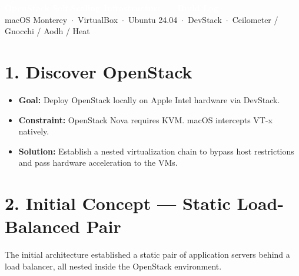 \documentclass[10pt,a4paper]{article}
\begin{document}
\begin{tcolorbox}[colback=osbg, colframe=osbg, arc=4pt, boxsep=2pt, left=6pt]
    \textcolor{white}{\Large\bfseries OpenStack Self-Scaling Infrastructure --- Build Log} \\
    \textcolor{osgray}{\small macOS Monterey \,$\cdot$\, VirtualBox \,$\cdot$\, Ubuntu 24.04 \,$\cdot$\, DevStack \,$\cdot$\, Ceilometer / Gnocchi / Aodh / Heat}
\end{tcolorbox}

\vspace{0.3em}

\section*{1. Discover OpenStack}
\begin{itemize}
    \item \textbf{Goal:} Deploy OpenStack locally on Apple Intel hardware via DevStack.
    \item \textbf{Constraint:} OpenStack Nova requires KVM. macOS intercepts VT-x natively.
    \item \textbf{Solution:} Establish a nested virtualization chain to bypass host restrictions and pass hardware acceleration to the VMs.
\end{itemize}

\section*{2. Initial Concept --- Static Load-Balanced Pair}
The initial architecture established a static pair of application servers behind a load balancer, all nested inside the OpenStack environment.
\end{document}
